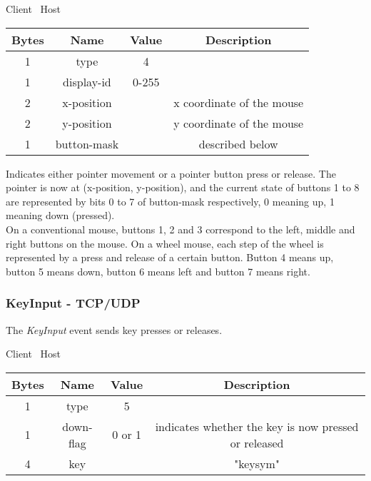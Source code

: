 \begin{center}
    Client \textrightarrow\ Host\\
    \begin{tabular}{|c|c|c|c|}
        \hline
        \textbf{Bytes} & \textbf{Name} & \textbf{Value} & \textbf{Description}      \\
        \hline
        1              & type          & 4              &                           \\
        \hline
        1              & display-id    & 0-255          &                           \\
        \hline
        2              & x-position    &                & x coordinate of the mouse \\
        \hline
        2              & y-position    &                & y coordinate of the mouse \\
        \hline
        1              & button-mask   &                & described below           \\
        \hline
    \end{tabular}
\end{center}

Indicates either pointer movement or a pointer button press or release. The pointer is now at (x-position,
y-position), and the current state of buttons 1 to 8 are represented by bits 0 to 7 of button-mask respectively,
0 meaning up, 1 meaning down (pressed).\\

On a conventional mouse, buttons 1, 2 and 3 correspond to the left, middle and right buttons on the mouse. On a
wheel mouse, each step of the wheel is represented by a press and release of a certain button. Button 4 means up,
button 5 means down, button 6 means left and button 7 means right.

\subsubsection{KeyInput - TCP/UDP}

The \emph{KeyInput} event sends key presses or releases.

\begin{center}
    Client \textrightarrow\ Host\\
    \begin{tabular}{|c|c|c|c|}
        \hline
        \textbf{Bytes} & \textbf{Name} & \textbf{Value} & \textbf{Description}                                 \\
        \hline
        1              & type          & 5              &                                                      \\
        \hline
        1              & down-flag     & 0 or 1         & indicates whether the key is now pressed or released \\
        \hline
        4              & key           &                & "keysym"                                             \\
        \hline
    \end{tabular}
\end{center}

